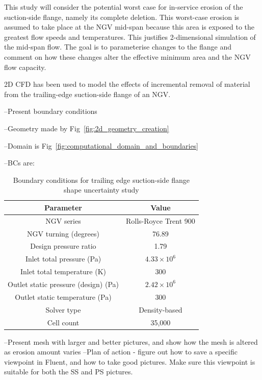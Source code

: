 \documentclass[a4paper, 11pt, twoside]{report}
\begin{document}
This study will consider the potential worst case for in-service erosion of the suction-side flange, namely its complete deletion. This worst-case erosion is assumed to take place at the NGV mid-span because this area is exposed to the greatest flow speeds and temperatures. This justifies 2-dimensional simulation of the mid-span flow. The goal is to parameterise changes to the flange and comment on how these changes alter the effective minimum area and the NGV flow capacity.

2D CFD has been used to model the effects of incremental removal of material from the trailing-edge suction-side flange of an NGV. 

--Present boundary conditions

--Geometry made by Fig~\ref{fig:2d_geometry_creation}

--Domain is Fig~\ref{fig:computational_domain_and_boundaries}

--BCs are:

\begin{table}[H]
\caption{Boundary conditions for trailing edge suction-side flange shape uncertainty study}
\label{ss_cutbacks_parameters}
\begin{center}
\begin{tabular}{|c|c|}
\hline
Parameter & Value\\
\hline
NGV series & Rolls-Royce Trent 900\\
NGV turning (degrees) & 76.89\\
Design pressure ratio & 1.79\\
Inlet total pressure (Pa) & $4.33 \times 10^6$\\
Inlet total temperature (K) & 300\\
Outlet static pressure (design) (Pa) & $2.42 \times 10^6$\\
Outlet static temperature (Pa) & 300\\
Solver type & Density-based\\
Cell count & 35,000\\
\hline
\end{tabular}
\end{center}
\end{table}

--Present mesh with larger and better pictures, and show how the mesh is altered as erosion amount varies
	--Plan of action - figure out how to save a specific viewpoint in Fluent, and how to take good pictures. Make sure this viewpoint is suitable for both the SS and PS pictures.
\end{document}
